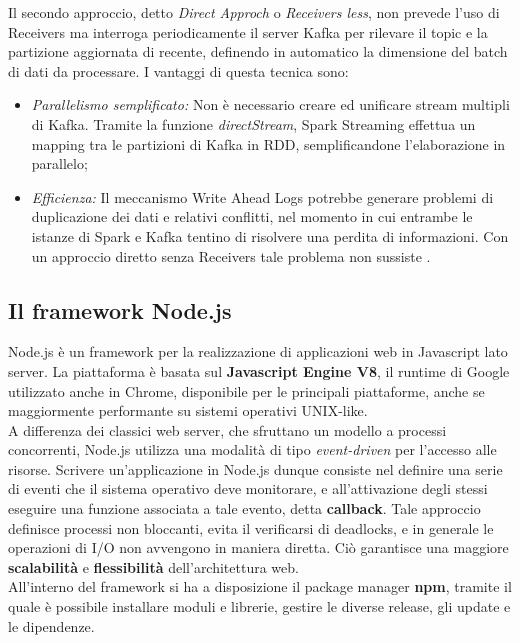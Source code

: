 \documentclass[12pt]{article}
\begin{document}
Il secondo approccio, detto \textit{Direct Approch} o \textit{Receivers less}, non prevede l'uso di Receivers ma interroga periodicamente il server Kafka per rilevare il topic e la partizione aggiornata di recente, definendo in automatico la dimensione del batch di dati da processare. I vantaggi di questa tecnica sono: 
\begin{itemize}
	\item \textit{Parallelismo semplificato: } Non è necessario creare ed unificare stream multipli di Kafka. Tramite la funzione \textit{directStream}, Spark Streaming effettua un mapping tra le partizioni di Kafka in RDD, semplificandone l'elaborazione in parallelo;
	\item \textit{Efficienza: } Il meccanismo Write Ahead Logs potrebbe generare problemi di duplicazione dei dati e relativi conflitti, nel momento in cui entrambe le istanze di Spark e Kafka tentino di risolvere una perdita di informazioni. Con un approccio diretto senza Receivers tale problema non sussiste \cite{spark}.
\end{itemize}

\subsection{Il framework Node.js}

Node.js è un framework per la realizzazione di applicazioni web in Javascript lato server. La piattaforma è basata sul \textbf{Javascript Engine V8}, il runtime di Google utilizzato anche in Chrome, disponibile per le principali piattaforme, anche se maggiormente performante su sistemi operativi UNIX-like.\\

A differenza dei classici web server, che sfruttano un modello a processi concorrenti, Node.js utilizza una modalità di tipo \textit{event-driven} per l'accesso alle risorse. Scrivere un'applicazione in Node.js dunque consiste nel definire una serie di eventi che il sistema operativo deve monitorare, e all'attivazione degli stessi eseguire una funzione associata a tale evento, detta \textbf{callback}. Tale approccio definisce processi non bloccanti, evita il verificarsi di deadlocks, e in generale le operazioni di I/O non avvengono in maniera diretta. Ciò garantisce una maggiore \textbf{scalabilità} e \textbf{flessibilità} dell'architettura web. \\

All'interno del framework si ha a disposizione il package manager \textbf{npm}, tramite il quale è possibile installare moduli e librerie, gestire le diverse release, gli update e le dipendenze.\\
\end{document}

